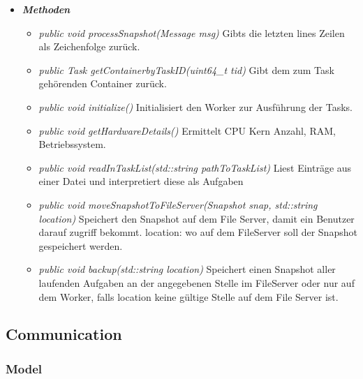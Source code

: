 \documentclass[a4paper,12pt]{article}
\begin{document}
\begin{itemize}[label={}]

	\item\textit{\textbf{Methoden}}
		\begin{itemize}[label={\textbullet}]
			\item\textit{public void processSnapshot(Message msg)} Gibts die letzten lines Zeilen als Zeichenfolge zurück.
			\item\textit{public Task getContainerbyTaskID(uint64\_t tid)} Gibt dem zum Task gehörenden Container zurück.
			\item\textit{public void initialize()} Initialisiert den Worker zur Ausführung der Tasks.
			\item\textit{public void getHardwareDetails()} Ermittelt CPU Kern Anzahl, RAM, Betriebssystem.
			\item\textit{public void readInTaskList(std::string pathToTaskList)} Liest Einträge aus einer Datei und interpretiert diese als Aufgaben
			\item\textit{public void moveSnapshotToFileServer(Snapshot snap, std::string location)} Speichert den Snapshot auf dem File Server, damit ein Benutzer darauf zugriff bekommt. location: wo auf dem FileServer soll der Snapshot gespeichert werden.
			\item\textit{public void backup(std::string location)} Speichert einen Snapshot aller laufenden Aufgaben an der angegebenen Stelle im FileServer oder nur auf dem Worker, falls location keine gültige Stelle auf dem File Server ist.
			
		\end{itemize}

\end{itemize}

\clearpage


\subsection{Communication}

\subsubsection{Model}
\end{document}
